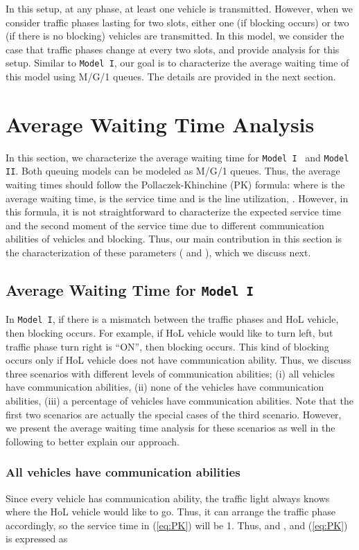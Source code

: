 \documentclass[conference]{IEEEtran}
\newcommand{\modelI}{{\tt{Model I}}}
\newcommand{\modelII}{{\tt{Model II}}}
\begin{document}
In this setup, at any phase, at least one vehicle is transmitted. However, when we consider traffic phases lasting for two slots, either one (if blocking occurs) or two (if there is no blocking) vehicles are transmitted. In this model, we consider the case that traffic phases change at every two slots, and provide analysis for this setup. Similar to \modelI, our goal is to characterize the average waiting time of this model using M/G/1 queues. The details are provided in the next section.

\vspace{-5pt}
\section{Average Waiting Time Analysis}\label{sec:waiting_time}
In this section, we characterize the average waiting time for \modelI~ and \modelII. Both queuing models can be modeled as M/G/1 queues. Thus, the average waiting times should follow the Pollaczek-Khinchine (PK) formula:
 where  is the average waiting time,  is the service time and  is the line utilization, . However, in this formula, it is not straightforward to characterize the expected service time  and the second moment of the service time  due to different communication abilities of vehicles and blocking. Thus, our main contribution in this section is the characterization of these parameters ( and ), which we discuss next.

\vspace{-5pt}
\subsection{Average Waiting Time for \modelI}
In \modelI, if there is a mismatch between the traffic phases and HoL vehicle, then blocking occurs. For example, if HoL vehicle would like to turn left, but traffic phase turn right is ``ON'', then blocking occurs. This kind of blocking occurs only if HoL vehicle does not have communication ability. Thus, we discuss three scenarios with different levels of communication abilities; (i) all vehicles have communication abilities, (ii) none of the vehicles have communication abilities, (iii) a percentage of vehicles have communication abilities. Note that the first two scenarios are actually the special cases of the third scenario. However, we present the average waiting time analysis for these scenarios as well in the following to better explain our approach.

\subsubsection{All vehicles have communication abilities}\label{everycartellsmodel1}
Since every vehicle has communication ability, the traffic light always knows where the HoL vehicle would like to go. Thus, it can arrange the traffic phase accordingly, so the service time  in (\ref{eq:PK}) will be 1. Thus,  and , and (\ref{eq:PK}) is expressed as
\end{document}

